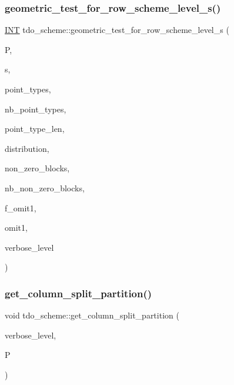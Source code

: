 \subsubsection{\texorpdfstring{geometric\+\_\+test\+\_\+for\+\_\+row\+\_\+scheme\+\_\+level\+\_\+s()}{geometric\_test\_for\_row\_scheme\_level\_s()}}
{\footnotesize\ttfamily \mbox{\hyperlink{galois_8h_a09fddde158a3a20bd2dcadb609de11dc}{I\+NT}} tdo\+\_\+scheme\+::geometric\+\_\+test\+\_\+for\+\_\+row\+\_\+scheme\+\_\+level\+\_\+s (\begin{DoxyParamCaption}\item[{\mbox{\hyperlink{classpartitionstack}{partitionstack}} \&}]{P,  }\item[{\mbox{\hyperlink{galois_8h_a09fddde158a3a20bd2dcadb609de11dc}{I\+NT}}}]{s,  }\item[{\mbox{\hyperlink{galois_8h_a09fddde158a3a20bd2dcadb609de11dc}{I\+NT}} $\ast$}]{point\+\_\+types,  }\item[{\mbox{\hyperlink{galois_8h_a09fddde158a3a20bd2dcadb609de11dc}{I\+NT}}}]{nb\+\_\+point\+\_\+types,  }\item[{\mbox{\hyperlink{galois_8h_a09fddde158a3a20bd2dcadb609de11dc}{I\+NT}}}]{point\+\_\+type\+\_\+len,  }\item[{\mbox{\hyperlink{galois_8h_a09fddde158a3a20bd2dcadb609de11dc}{I\+NT}} $\ast$}]{distribution,  }\item[{\mbox{\hyperlink{galois_8h_a09fddde158a3a20bd2dcadb609de11dc}{I\+NT}} $\ast$}]{non\+\_\+zero\+\_\+blocks,  }\item[{\mbox{\hyperlink{galois_8h_a09fddde158a3a20bd2dcadb609de11dc}{I\+NT}}}]{nb\+\_\+non\+\_\+zero\+\_\+blocks,  }\item[{\mbox{\hyperlink{galois_8h_a09fddde158a3a20bd2dcadb609de11dc}{I\+NT}}}]{f\+\_\+omit1,  }\item[{\mbox{\hyperlink{galois_8h_a09fddde158a3a20bd2dcadb609de11dc}{I\+NT}}}]{omit1,  }\item[{\mbox{\hyperlink{galois_8h_a09fddde158a3a20bd2dcadb609de11dc}{I\+NT}}}]{verbose\+\_\+level }\end{DoxyParamCaption})}

\mbox{\label{classtdo__scheme_a5555b89fcee5e51193ccc8e13ac782a5}} 
\subsubsection{\texorpdfstring{get\+\_\+column\+\_\+split\+\_\+partition()}{get\_column\_split\_partition()}}
{\footnotesize\ttfamily void tdo\+\_\+scheme\+::get\+\_\+column\+\_\+split\+\_\+partition (\begin{DoxyParamCaption}\item[{\mbox{\hyperlink{galois_8h_a09fddde158a3a20bd2dcadb609de11dc}{I\+NT}}}]{verbose\+\_\+level,  }\item[{\mbox{\hyperlink{classpartitionstack}{partitionstack}} \&}]{P }\end{DoxyParamCaption})}

